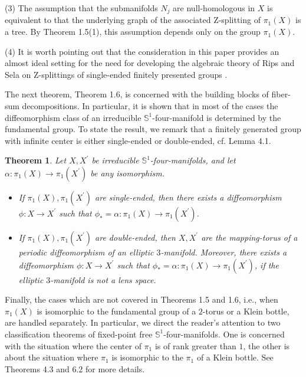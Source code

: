 \documentclass[11pt]{amsart}
\theoremstyle{plain}
\newtheorem{theorem}{Theorem}
\numberwithin{theorem}{section}
\theoremstyle{definition}
\begin{document}
(3) The assumption that the submanifolds $N_j$ are null-homologous in $X$ is equivalent to 
that the underlying graph of the associated Z-splitting of $\pi_1(X)$ is a tree. By Theorem 1.5(1),
this assumption depends only on the group $\pi_1(X)$.

(4) It is worth pointing out that the consideration in this paper provides an almost ideal setting
for the need for developing the algebraic theory of Rips and Sela on Z-splittings  
of single-ended finitely presented groups \cite{RipS}.

\vspace{2mm}

The next theorem, Theorem 1.6, is concerned with the building blocks of fiber-sum decompositions. 
In particular, it is shown that in most of the cases the diffeomorphism class of an irreducible 
${{\mathbb S}}^1$-four-manifold is determined by the fundamental group. To state the result, we remark that a 
finitely generated group with infinite center is either single-ended or double-ended, cf. Lemma 4.1.

\begin{theorem}
Let $X, X^\prime$ be irreducible ${{\mathbb S}}^1$-four-manifolds, and let 
$\alpha: \pi_1(X)\rightarrow \pi_1(X^\prime)$ be any isomorphism. 
\begin{itemize}
\item [{(1)}] If $\pi_1(X), \pi_1(X^\prime)$ are single-ended, then there exists a diffeomorphism 
$\phi: X\rightarrow X^\prime$ such that $\phi_\ast =\alpha: \pi_1(X)\rightarrow \pi_1(X^\prime)$.
\item [{(2)}] If $\pi_1(X), \pi_1(X^\prime)$ are double-ended, then $X, X^\prime$ are the 
mapping-torus of a periodic diffeomorphism of an elliptic $3$-manifold. Moreover, 
there exists a diffeomorphism 
$\phi: X\rightarrow X^\prime$ such that $\phi_\ast =\alpha: \pi_1(X)\rightarrow \pi_1(X^\prime)$, if
the elliptic $3$-manifold is not a lens space.
\end{itemize}
\end{theorem}

Finally, the cases which are not covered in Theorems 1.5 and 1.6, i.e., when $\pi_1(X)$ is isomorphic 
to the fundamental group of a $2$-torus or a Klein bottle, are handled separately. In particular, we direct
the reader's attention to two classification theorems of fixed-point free ${{\mathbb S}}^1$-four-manifolds. One is concerned with the situation where the center of $\pi_1$ is of rank greater than $1$, the other is about 
the situation where $\pi_1$ is isomorphic to the $\pi_1$ of a Klein bottle. See Theorems 4.3 and 6.2 
for more details.
\end{document}
